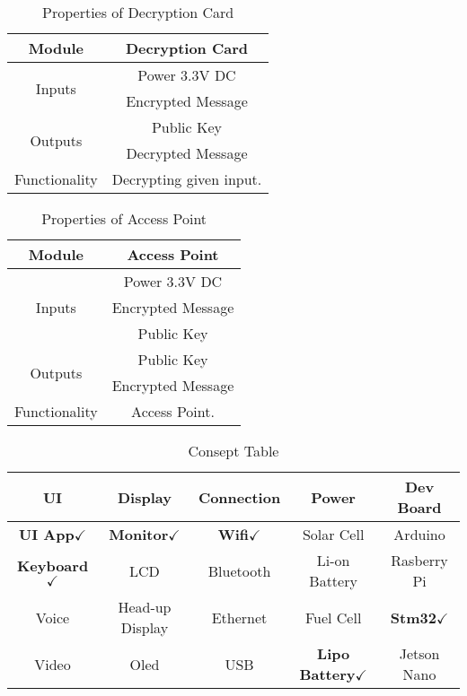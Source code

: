 \documentclass[12pt]{article}
\begin{document}
\begin{table}[h]

	\centering	
	\label{Properties of Decryption Card }
	\begin{tabular}{|c|c|}
	\hline
	Module & Decryption Card\\ \hline
		\multirow{2}{*}{Inputs} & Power 3.3V DC \\ \cline{2-2}
	& Encrypted Message \\ \hline
		\multirow{2}{*}{Outputs} & Public Key \\ \cline{2-2}
	& Decrypted Message \\ \hline
	Functionality & Decrypting given input.\\ \hline	
		
	\end{tabular}
	\caption{Properties of Decryption Card}

\end{table}
	\begin{table}[H]

		\centering		
		\label{Properties of Access Point }
		\begin{tabular}{|c|c|}
			\hline
			Module & Access Point \\ \hline
			\multirow{3}{*}{Inputs} & Power 3.3V DC \\
			
			\cline{2-2}
				& Encrypted Message \\
		
			\cline{2-2}
				& Public Key \\
			\cline{2-2} \hline
	
				\multirow{2}{*}{Outputs} 	& Public Key \\
			\cline{2-2}
			& Encrypted Message \\
			
			\cline{2-2} \hline
			
			Functionality & Access Point.\\ \hline	
	
		\end{tabular}
		\caption{Properties of Access Point}

	\end{table}
	
	\begin{table}[H]
	\centering
	\begin{tabular}{|c|c|c|c|c|}
		\hline
		UI & Display & Connection & Power & Dev Board \\
		\hline
		\textbf{UI App}$\checkmark$
		 &\textbf{Monitor}$\checkmark$
		   & \textbf{Wifi}$\checkmark$
		   & Solar Cell & Arduino\\
		\hline
		\textbf{Keyboard}$\checkmark$
		 & LCD & Bluetooth & Li-on Battery & Rasberry Pi \\
		\hline
		Voice & Head-up Display & Ethernet & Fuel Cell &\textbf{Stm32}$\checkmark$
		 \\
		\hline
		Video & Oled & USB & \textbf{Lipo Battery}$\checkmark$
		 & Jetson Nano \\
		\hline
	\end{tabular}
	\caption{Consept Table}
\end{table}
\end{document}
